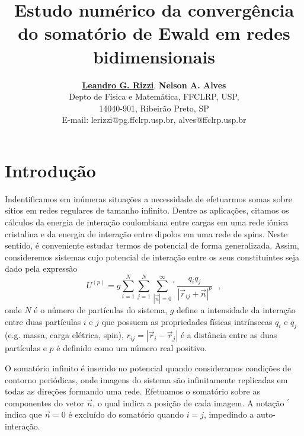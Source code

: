 \documentclass[twocolumn,a4,11pt]{article}
\begin{document}
\title{\Large{\bf Estudo numérico da convergência do somatório de Ewald em redes bidimensionais}}

\author{{\bf {\large \underline{Leandro G. Rizzi}}}, {\bf {\large Nelson A. Alves}} \\
 {\small Depto de Física e Matemática, FFCLRP, USP,} \\
 {\small 14040-901, Ribeirão Preto, SP} \\
 {\small E-mail: lerizzi@pg.ffclrp.usp.br, alves@ffclrp.usp.br}}

\date{}

\maketitle

\thispagestyle{empty}

\section{Introdução}

Indentificamos em inúmeras situações a necessidade de efetuarmos somas sobre sítios em redes regulares de tamanho infinito. Dentre as aplicações, citamos os cálculos da energia de interação coulombiana entre cargas em uma rede iônica cristalina e da energia de interação entre dipolos em uma rede de spins. Neste sentido, é conveniente estudar termos de potencial de forma generalizada. Assim, consideremos sistemas cujo potencial de interação entre os seus constituintes seja dado pela expressão
\begin{equation}
U^{(p)}=g \sum_{i=1}^{N} \sum_{j=1}^{N} \sum_{|\vec{n}|=0}^{\infty} {}^{\prime} ~
\frac{q_{i} q_{j}}{ \left| \vec{r}_{ij} + \vec{n} \right|^{p} } ~~~,
\label{utotal_s_s}
\end{equation}
onde $N$ é o número de partículas do sistema, $g$ define a intensidade da interação entre duas partículas $i$ e $j$ que possuem as propriedades físicas intrínsecas $q_{i}$ e $q_{j}$ (e.g. massa, carga elétrica, spin), $r_{ij}=|\vec{r}_{i}-\vec{r}_{j}|$ é a distância entre as duas partículas e $p$ é definido como um número real positivo.

O somatório infinito é inserido no potencial quando consideramos condições de contorno periódicas, onde imagens do sistema são infinitamente replicadas em todas as direções formando uma rede. Efetuamos o somatório sobre as componentes do vetor $\vec{n}$, o qual indica a posição de cada imagem. A notação ${}^{\prime}$ indica que $\vec{n}=0$ é excluído do somatório quando $i=j$, impedindo a auto-interação.
\end{document}
